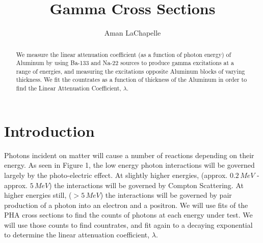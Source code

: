 \documentclass{article}
\title{Gamma Cross Sections}
\author{Aman LaChapelle}
\begin{document}
\maketitle

	\begin{abstract}
		We measure the linear attenuation coefficient (as a function of photon energy) of Aluminum by using Ba-133 and Na-22 sources to produce gamma excitations at a range of energies, and measuring the excitations opposite Aluminum blocks of varying thickness.  We fit the countrates as a function of thickness of the Aluminum in order to find the Linear Attenuation Coefficient, $\lambda$.
	\end{abstract}


\tableofcontents
\newpage

\section{Introduction}
	Photons incident on matter will cause a number of reactions depending on their energy.  As seen in Figure 1, the low energy photon interactions will be governed largely by the photo-electric effect.  At slightly higher energies, (approx. $0.2 \, MeV$ - approx. $5 \, MeV$) the interactions will be governed by Compton Scattering.  At higher energies still, ($>5 \, MeV$) the interactions will be governed by pair production of a photon into an electron and a positron.  We will use fits of the PHA cross sections to find the counts of photons at each energy under test.  We will use those counts to find countrates, and fit again to a decaying exponential to determine the linear attenuation coefficient, $\lambda$.
	
	\hspace{1cm}
\end{document}
